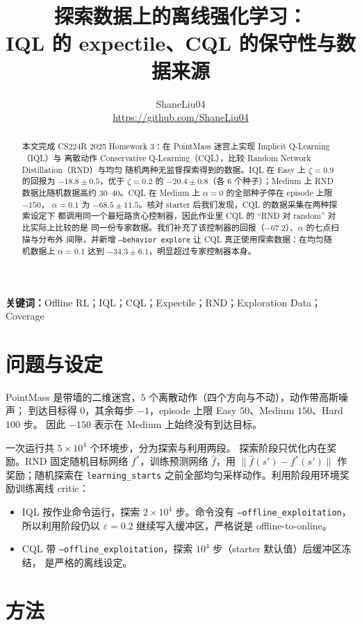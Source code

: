 \documentclass[10pt,twocolumn,a4paper]{ctexart}
\title{\vspace{-1.2em}\textbf{探索数据上的离线强化学习：\\
IQL 的 expectile、CQL 的保守性与数据来源}}
\author{ShaneLiu04\\
\small\url{https://github.com/ShaneLiu04}}
\date{}
\begin{document}
\maketitle
\thispagestyle{fancy}

\begin{abstract}
本文完成 CS224R 2025 Homework 3：在 PointMass 迷宫上实现 Implicit Q-Learning（IQL）与
离散动作 Conservative Q-Learning（CQL），比较 Random Network Distillation（RND）与均匀
随机两种无监督探索得到的数据。IQL 在 Easy 上 $\zeta=0.9$ 的回报为 $-18.8\pm0.5$，优于
$\zeta=0.2$ 的 $-20.4\pm0.8$（各 $6$ 个种子）；Medium 上 RND 数据比随机数据高约
$30$--$40$。CQL 在 Medium 上 $\alpha=0$ 的全部种子停在 episode 上限 $-150$，
$\alpha=0.1$ 为 $-68.5\pm11.5$。核对 starter 后我们发现，CQL 的数据采集在两种探索设定下
都调用同一个最短路贪心控制器，因此作业里 CQL 的 ``RND 对 random'' 对比实际上比较的是
同一份专家数据。我们补充了该控制器的回报（$-67.2$）、$\alpha$ 的七点扫描与分布外
间隙，并新增 \texttt{--behavior explore} 让 CQL 真正使用探索数据：在均匀随机数据上
$\alpha=0.1$ 达到 $-34.3\pm6.1$，明显超过专家控制器本身。
\end{abstract}

\textbf{关键词：}Offline RL；IQL；CQL；Expectile；RND；Exploration Data；Coverage

\section{问题与设定}
PointMass 是带墙的二维迷宫，$5$ 个离散动作（四个方向与不动），动作带高斯噪声；
到达目标得 $0$，其余每步 $-1$，episode 上限 Easy $50$、Medium $150$、Hard $100$ 步。
因此 $-150$ 表示在 Medium 上始终没有到达目标。

一次运行共 $5\times10^4$ 个环境步，分为探索与利用两段\citep{yarats2022exorl}。
探索阶段只优化内在奖励。RND 固定随机目标网络 $f^*$，训练预测网络 $\hat f$，用
$\lVert\hat f(s')-f^*(s')\rVert$ 作奖励\citep{burda2019rnd}；随机探索在
\texttt{learning\_starts} 之前全部均匀采样动作。利用阶段用环境奖励训练离线 critic：
\begin{itemize}
\item IQL 按作业命令运行，探索 $2\times10^4$ 步。命令没有 \texttt{--offline\_exploitation}，
所以利用阶段仍以 $\varepsilon=0.2$ 继续写入缓冲区，严格说是 offline-to-online。
\item CQL 带 \texttt{--offline\_exploitation}，探索 $10^4$ 步（starter 默认值）后缓冲区冻结，
是严格的离线设定。
\end{itemize}

\section{方法}
\end{document}
